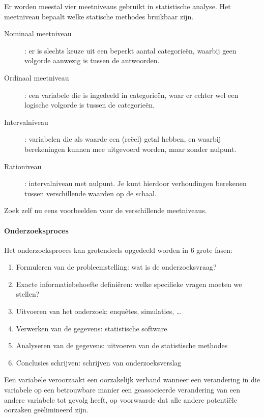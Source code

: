Er worden meestal vier meetniveaus gebruikt in statistische analyse. Het meetniveau bepaalt welke statische methodes bruikbaar zijn.

\begin{description}
  \item [Nominaal meetniveau] : er is slechts keuze uit een beperkt aantal categorie\"en, waarbij geen volgorde aanwezig is tussen de antwoorden.
  \item [Ordinaal meetniveau] : een variabele die is ingedeeld in categorie\"en, waar er echter wel een logische volgorde is tussen de categorieën. 
  \item [Intervalniveau] : variabelen die als waarde een (reëel) getal hebben, en waarbij berekeningen kunnen mee uitgevoerd worden, maar zonder nulpunt.
  \item [Rationiveau] : intervalniveau met nulpunt. Je kunt hierdoor verhoudingen berekenen tussen verschillende waarden op de schaal.
\end{description}

\begin{exercise}
  Zoek zelf nu eens voorbeelden voor de verschillende meetniveaus.
\end{exercise}

\paragraph{Onderzoeksproces}
Het onderzoeksproces kan grotendeels opgedeeld worden in 6 grote fasen:
\begin{enumerate}
  \item Formuleren van de probleemstelling: wat is de onderzoeksvraag?
  \item Exacte informatiebehoefte defini\"eren: welke specifieke vragen moeten we stellen?
  \item Uitvoeren van het onderzoek: enqu\^etes, simulaties, \dots
  \item Verwerken van de gegevens: statistische software
  \item Analyseren van de gegevens: uitvoeren van de statistische methodes
  \item Conclusies schrijven: schrijven van onderzoeksverslag
\end{enumerate}

\begin{definition}
 Een variabele veroorzaakt een oorzakelijk verband wanneer een verandering in die variabele op een betrouwbare manier een geassocieerde verandering van een andere variabele tot gevolg heeft, op voorwaarde dat alle andere potenti\"ele oorzaken ge\"elimineerd zijn.
\end{definition}

